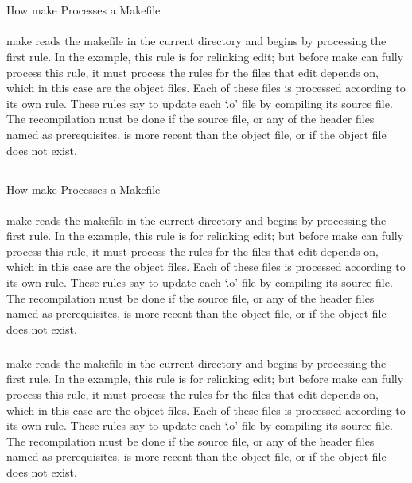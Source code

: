 \documentclass[a4paper]{article}
\begin{document}
\section{}
How make Processes a Makefile
\paragraph{}

make reads the makefile in the current directory and begins by processing the first rule.
In the example, this rule is for relinking edit; but before make can fully process this rule, it must process the rules for the files that edit depends on, which in this case are the object files.
Each of these files is processed according to its own rule. 
These rules say to update each ‘.o’ file by compiling its source file. 
The recompilation must be done if the source file, or any of the header files named as prerequisites, is more recent than the object file, or if the object file does not exist.

\subsection{}
How make Processes a Makefile
\paragraph{}
make reads the makefile in the current directory and begins by processing the first rule.
In the example, this rule is for relinking edit; but before make can fully process this rule, it must process the rules for the files that edit depends on, which in this case are the object files.
Each of these files is processed according to its own rule. 
These rules say to update each ‘.o’ file by compiling its source file. 
The recompilation must be done if the source file, or any of the header files named as prerequisites, is more recent than the object file, or if the object file does not exist.

\subparagraph{}
make reads the makefile in the current directory and begins by processing the first rule.
In the example, this rule is for relinking edit; but before make can fully process this rule, it must process the rules for the files that edit depends on, which in this case are the object files.
Each of these files is processed according to its own rule. 
These rules say to update each ‘.o’ file by compiling its source file. 
The recompilation must be done if the source file, or any of the header files named as prerequisites, is more recent than the object file, or if the object file does not exist.
\end{document}

